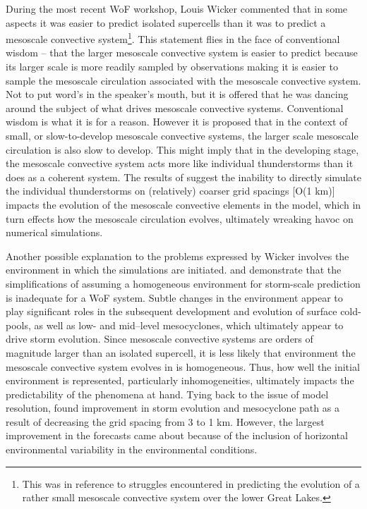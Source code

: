 During the most recent WoF workshop, Louis Wicker commented that in some aspects it was easier to predict isolated supercells than it was to predict a mesoscale convective system\footnote{This was in reference to struggles encountered in predicting the evolution of a rather small mesoscale convective system over the lower Great Lakes.}. This statement flies in the face of conventional wisdom -- that the larger mesoscale convective system is easier to predict because its larger scale is more readily sampled by observations making it is easier to sample the mesoscale circulation associated with the mesoscale convective system. Not to put word's in the speaker's mouth, but it is offered that he was dancing around the subject of what drives mesoscale convective systems. Conventional wisdom is what it is for a reason. However it is proposed that in the context of small, or slow-to-develop mesoscale convective systems, the larger scale mesoscale circulation is also slow to develop. This might imply that in the developing stage, the mesoscale convective system acts more like individual thunderstorms than it does as a coherent system. The results of \cite{bryan2003resolution} suggest the inability to directly simulate the individual thunderstorms on (relatively) coarser grid spacings [O(1 km)] impacts the evolution of the mesoscale convective elements in the model, which in turn effects how the mesoscale circulation evolves, ultimately wreaking havoc on numerical simulations.


Another possible explanation to the problems expressed by Wicker involves the environment in which the simulations are initiated. \cite{stensrud20103dvar} and \cite{dawson2012enkf} demonstrate that the simplifications of assuming a homogeneous environment for storm-scale prediction is inadequate for a WoF system. Subtle changes in the environment appear to play significant roles in the subsequent development and evolution of surface cold-pools, as well as low- and mid--level mesocyclones, which ultimately appear to drive storm evolution. Since mesoscale convective systems are orders of magnitude larger than an isolated supercell, it is less likely that environment the mesoscale convective system evolves in is homogeneous. Thus, how well the initial environment is represented, particularly inhomogeneities, ultimately impacts the predictability of the phenomena at hand. Tying back to the issue of model resolution, \cite{stensrud20103dvar} found improvement in storm evolution and mesocyclone path as a result of decreasing the grid spacing from 3 to 1 km. However, the largest improvement in the forecasts came about because of the inclusion of horizontal environmental variability in the environmental conditions.


